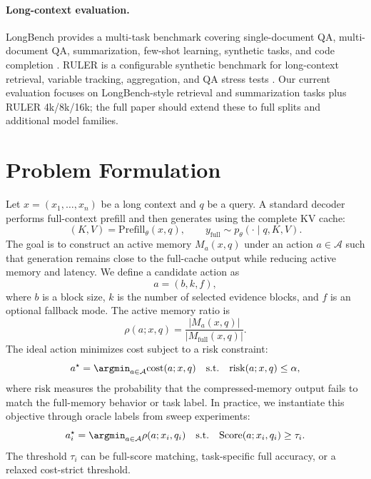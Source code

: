 \documentclass{article}
\newcommand{\action}{\mathcal{A}}
\newcommand{\cost}{\mathrm{cost}}
\newcommand{\risk}{\mathrm{risk}}
\newcommand{\Score}{\mathrm{Score}}
\begin{document}
\paragraph{Long-context evaluation.}
LongBench provides a multi-task benchmark covering single-document QA, multi-document QA, summarization, few-shot learning, synthetic tasks, and code completion \citep{bai2023longbench}.
RULER is a configurable synthetic benchmark for long-context retrieval, variable tracking, aggregation, and QA stress tests \citep{hsieh2024ruler}.
Our current evaluation focuses on LongBench-style retrieval and summarization tasks plus RULER 4k/8k/16k; the full paper should extend these to full splits and additional model families.

\section{Problem Formulation}

Let $x=(x_1,\ldots,x_n)$ be a long context and $q$ be a query.
A standard decoder performs full-context prefill and then generates using the complete KV cache:
\begin{equation}
    (K,V) = \mathrm{Prefill}_\theta(x,q), \qquad
    y_{\mathrm{full}} \sim p_\theta(\cdot \mid q, K,V).
\end{equation}
The goal is to construct an active memory $M_a(x,q)$ under an action $a \in \action$ such that generation remains close to the full-cache output while reducing active memory and latency.
We define a candidate action as
\begin{equation}
    a=(b,k,f),
\end{equation}
where $b$ is a block size, $k$ is the number of selected evidence blocks, and $f$ is an optional fallback mode.
The active memory ratio is
\begin{equation}
    \rho(a;x,q) = \frac{|M_a(x,q)|}{|M_{\mathrm{full}}(x,q)|}.
\end{equation}
The ideal action minimizes cost subject to a risk constraint:
\begin{equation}
    a^\star
    =
    \argmin_{a \in \action}
    \cost(a;x,q)
    \quad
    \text{s.t.}
    \quad
    \risk(a;x,q) \leq \alpha,
    \label{eq:risk-objective}
\end{equation}
where $\risk$ measures the probability that the compressed-memory output fails to match the full-memory behavior or task label.
In practice, we instantiate this objective through oracle labels from sweep experiments:
\begin{equation}
    a^\star_i
    =
    \argmin_{a \in \action}
    \rho(a;x_i,q_i)
    \quad
    \text{s.t.}
    \quad
    \Score(a;x_i,q_i) \geq \tau_i.
    \label{eq:oracle-label}
\end{equation}
The threshold $\tau_i$ can be full-score matching, task-specific full accuracy, or a relaxed cost-strict threshold.
\end{document}
